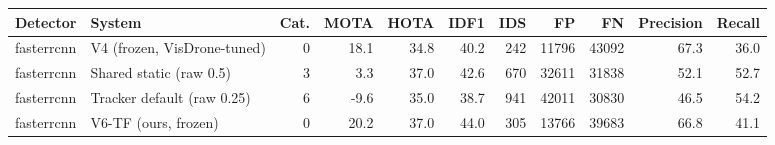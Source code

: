 \begin{tabular}{llrrrrrrrrr}
\toprule
Detector & System & Cat. & MOTA & HOTA & IDF1 & IDS & FP & FN & Precision & Recall \\
\midrule
fasterrcnn & V4 (frozen, VisDrone-tuned) & 0 & 18.1 & 34.8 & 40.2 & 242 & 11796 & 43092 & 67.3 & 36.0 \\
fasterrcnn & Shared static (raw 0.5) & 3 & 3.3 & 37.0 & 42.6 & 670 & 32611 & 31838 & 52.1 & 52.7 \\
fasterrcnn & Tracker default (raw 0.25) & 6 & -9.6 & 35.0 & 38.7 & 941 & 42011 & 30830 & 46.5 & 54.2 \\
fasterrcnn & V6-TF (ours, frozen) & 0 & 20.2 & 37.0 & 44.0 & 305 & 13766 & 39683 & 66.8 & 41.1 \\
\bottomrule
\end{tabular}

